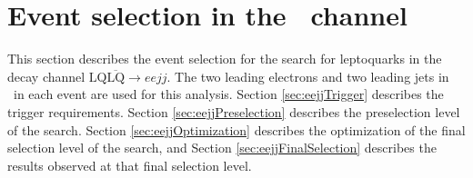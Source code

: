 \section{Event selection in the \eejj~channel}
\label{sec:eejjSelection}

This section describes the event selection for the search
for leptoquarks in the decay channel $\text{LQ}\overline{\text{LQ}}\rightarrow eejj$.
The two leading electrons and two leading jets in \pt~in each event are used 
for this analysis.  
Section \ref{sec:eejjTrigger} describes the trigger requirements.
Section \ref{sec:eejjPreselection} describes the preselection level of the search.
Section \ref{sec:eejjOptimization} describes the optimization of the final selection level of the search, and
Section \ref{sec:eejjFinalSelection} describes the results observed at that final selection level.

